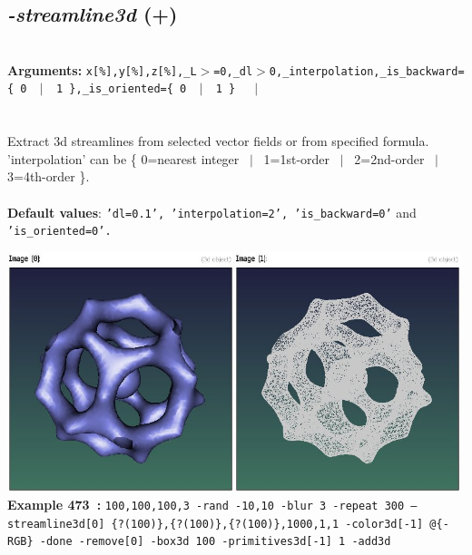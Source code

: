 \documentclass[a4paper,11pt,twoside]{book}
\begin{document}
\subsection{\emph{-streamline3d} (+)}\vspace*{-0.5em}
~\\\textbf{Arguments: } 
{\small \texttt{x[\%],y[\%],z[\%],\_L$>$=0,\_dl$>$0,\_interpolation,\_is\_backward=\{ 0 ~$|$~ 1 \},\_is\_oriented=\{ 0 ~$|$~ 1 \}}}~~~$|$\\
\\~\\
Extract 3d streamlines from selected vector fields or from specified formula.
~\\'interpolation' can be \{ 0=nearest integer ~$|$~ 1=1st-order ~$|$~ 2=2nd-order ~$|$~ 3=4th-order \}.
~\\~\\\textbf{Default values}: {\small \texttt{'dl=0.1', 'interpolation=2', 'is\_backward=0'} and \texttt{'is\_oriented=0'.}}
\begin{center}\includegraphics[keepaspectratio=true,height=7cm,width=\textwidth]{img/gmic_def473.jpg}\\
{\footnotesize \textbf{Example 473~:} \texttt{100,100,100,3 -rand -10,10 -blur 3 -repeat 300 --streamline3d[0] \{?(100)\},\{?(100)\},\{?(100)\},1000,1,1 -color3d[-1] @\{-RGB\} -done -remove[0] -box3d 100 -primitives3d[-1] 1 -add3d}}
\end{center}
\end{document}
